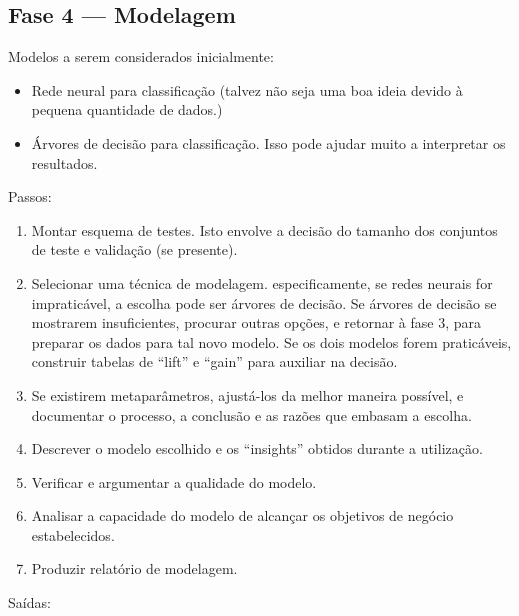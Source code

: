 \documentclass[12pt,oneside,a4paper]{article}
\begin{document}
\subsection{Fase 4 --- Modelagem}

Modelos a serem considerados inicialmente:

\begin{itemize}

\item Rede neural para classificação (talvez não seja uma boa ideia devido à pequena quantidade de dados.)
  
\item Árvores de decisão para classificação. Isso pode ajudar muito a interpretar os resultados.
  
\end{itemize}

Passos:

\begin{enumerate}

\item Montar esquema de testes. Isto envolve a decisão do tamanho dos conjuntos de teste e validação (se presente).

\item Selecionar uma técnica de modelagem. especificamente, se redes neurais for impraticável, a escolha pode ser árvores de decisão. Se árvores de decisão se mostrarem insuficientes, procurar outras opções, e retornar à fase 3, para preparar os dados para tal novo modelo. Se os dois modelos forem praticáveis, construir tabelas de ``lift'' e ``gain'' para auxiliar na decisão.

\item Se existirem metaparâmetros, ajustá-los da melhor maneira possível, e documentar o processo, a conclusão e as razões que embasam a escolha.

\item Descrever o modelo escolhido e os ``insights'' obtidos durante a utilização.

\item Verificar e argumentar a qualidade do modelo.

\item Analisar a capacidade do modelo de alcançar os objetivos de negócio estabelecidos.

\item Produzir relatório de modelagem.

\end{enumerate}

Saídas:
\end{document}
